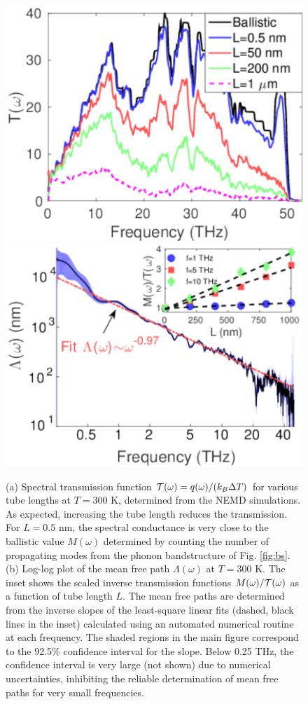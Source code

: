 \begin{figure}[tb]
 \begin{center}
  \includegraphics[width=.49\columnwidth]{pics/cnt_fig2.pdf} 
  \includegraphics[width=.49\columnwidth]{pics/cnt_fig4.pdf} 
  \caption{(a) Spectral transmission function $\mathcal{T}(\omega)=q(\omega)/(k_B\Delta T)$ for various tube lengths at $T=300$ K, determined from the NEMD simulations. As expected, increasing the tube length reduces the transmission. For $L=0.5$ nm, the spectral conductance is very close to the ballistic value $M(\omega)$ determined by counting the number of propagating modes from the phonon bandstructure of Fig. \ref{fig:bs}. (b) Log-log plot of the mean free path $\Lambda(\omega)$ at $T=300$ K. The inset shows the scaled inverse transmission functions $M(\omega)/\mathcal{T}(\omega)$ as a function of tube length $L$. The mean free paths are determined from the inverse slopes of the least-square linear fits (dashed, black lines in the inset) calculated using an automated numerical routine at each frequency. The shaded regions in the main figure correspond to the 92.5\% confidence interval for the slope. Below 0.25 THz, the confidence interval is very large (not shown) due to numerical uncertainties, inhibiting the reliable determination of mean free paths for very small frequencies.}  
\label{fig:cnt_fig2}
 \end{center}
\end{figure}

